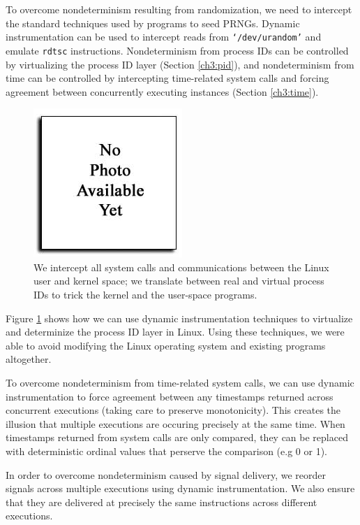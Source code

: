 To overcome nondeterminism resulting from randomization, 
we need to intercept the standard techniques
used by programs to seed PRNGs.
Dynamic instrumentation can be used to 
intercept reads from \texttt{`/dev/urandom'}
and emulate \texttt{rdtsc} instructions.
Nondeterminism from process IDs
can be controlled by virtualizing the process ID
layer (Section \ref{ch3:pid}), and nondeterminism
from time can be controlled by intercepting
time-related system calls and forcing
agreement between concurrently executing 
instances (Section \ref{ch3:time}).

\begin{figure}[h]
  \center
  \includegraphics[trim=0cm 0cm 0cm 0cm, scale=0.75]{none.jpg}
  \caption[Virtualizing the process ID layer using Pin]%
  {We intercept all system calls and communications
  between the Linux user and kernel space; we
  translate between real and virtual process IDs
  to trick the kernel and the user-space programs.}
  \label{ch3:pidfig}
\end{figure} 

Figure \ref{ch3:pidfig} shows how we can use dynamic instrumentation
techniques to virtualize and determinize the process ID layer in Linux.
Using these techniques, we were able to avoid modifying
the Linux operating system and existing programs
altogether.

To overcome nondeterminism from time-related system calls,
we can use dynamic instrumentation to force agreement between 
any timestamps returned across concurrent
executions (taking care to preserve monotonicity).
This creates the illusion that multiple executions
are occuring precisely at the same time. When timestamps
returned from system calls are only compared, they
can be replaced with deterministic ordinal values that 
perserve the comparison (e.g 0 or 1). 

In order to overcome nondeterminism caused
by signal delivery, we reorder signals 
across multiple executions using
dynamic instrumentation.
We also ensure that they are delivered 
at precisely the same instructions
across different executions.


